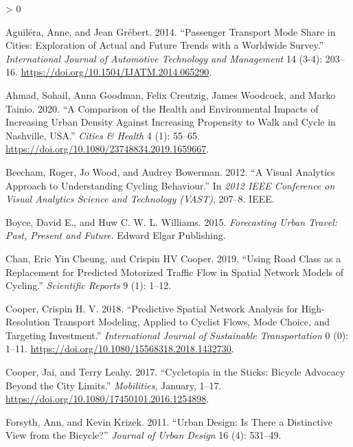 \documentclass[galley]{jtlu-article-2col}
\newlength{\cslhangindent}
\newenvironment{CSLReferences}[2] %
 {%
  \setlength{\parindent}{0pt}
  \ifodd #1 \everypar{\setlength{\hangindent}{\cslhangindent}}\ignorespaces\fi
  \ifnum #2 > 0
  \setlength{\parskip}{#2\baselineskip}
  \fi
 }%
 {}
\begin{document}
\hypertarget{refs}{}
\begin{CSLReferences}{1}{0}
\leavevmode\hypertarget{ref-aguilera_passenger_2014}{}%
Aguiléra, Anne, and Jean Grébert. 2014. {``Passenger Transport Mode Share in Cities: Exploration of Actual and Future Trends with a Worldwide Survey.''} \emph{International Journal of Automotive Technology and Management} 14 (3-4): 203--16. \url{https://doi.org/10.1504/IJATM.2014.065290}.

\leavevmode\hypertarget{ref-ahmad_comparison_2020}{}%
Ahmad, Sohail, Anna Goodman, Felix Creutzig, James Woodcock, and Marko Tainio. 2020. {``A Comparison of the Health and Environmental Impacts of Increasing Urban Density Against Increasing Propensity to Walk and Cycle in {Nashville}, {USA}.''} \emph{Cities \& Health} 4 (1): 55--65. \url{https://doi.org/10.1080/23748834.2019.1659667}.

\leavevmode\hypertarget{ref-beecham_visual_2012}{}%
Beecham, Roger, Jo Wood, and Audrey Bowerman. 2012. {``A Visual Analytics Approach to Understanding Cycling Behaviour.''} In \emph{2012 {IEEE Conference} on {Visual Analytics Science} and {Technology} ({VAST})}, 207--8. {IEEE}.

\leavevmode\hypertarget{ref-boyce_forecasting_2015}{}%
Boyce, David E., and Huw C. W. L. Williams. 2015. \emph{Forecasting {Urban Travel}: {Past}, {Present} and {Future}}. {Edward Elgar Publishing}.

\leavevmode\hypertarget{ref-chan_using_2019}{}%
Chan, Eric Yin Cheung, and Crispin HV Cooper. 2019. {``Using Road Class as a Replacement for Predicted Motorized Traffic Flow in Spatial Network Models of Cycling.''} \emph{Scientific Reports} 9 (1): 1--12.

\leavevmode\hypertarget{ref-cooper_predictive_2018}{}%
Cooper, Crispin H. V. 2018. {``Predictive Spatial Network Analysis for High-Resolution Transport Modeling, Applied to Cyclist Flows, Mode Choice, and Targeting Investment.''} \emph{International Journal of Sustainable Transportation} 0 (0): 1--11. \url{https://doi.org/10.1080/15568318.2018.1432730}.

\leavevmode\hypertarget{ref-cooper_cycletopia_2017}{}%
Cooper, Jai, and Terry Leahy. 2017. {``Cycletopia in the Sticks: Bicycle Advocacy Beyond the City Limits.''} \emph{Mobilities}, January, 1--17. \url{https://doi.org/10.1080/17450101.2016.1254898}.

\leavevmode\hypertarget{ref-forsyth_urban_2011}{}%
Forsyth, Ann, and Kevin Krizek. 2011. {``Urban Design: Is There a Distinctive View from the Bicycle?''} \emph{Journal of Urban Design} 16 (4): 531--49.


\end{CSLReferences}
\end{document}
